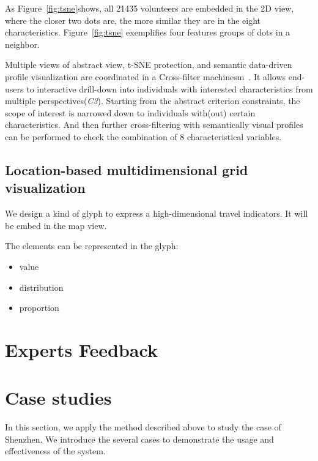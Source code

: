 As Figure~\ref{fig:tsne}shows, all 21435 volunteers are embedded in the 2D view, where the closer two dots are, the more similar they are in the eight characteristics. Figure~\ref{fig:tsne} exemplifies four features groups of dots in a neighbor.

Multiple views of abstract view, t-SNE protection, and semantic data-driven profile visualization are coordinated in a Cross-filter machinesm~\citep{Weaver2010}. It allows end-users to interactive drill-down into individuals with interested characteristics from multiple perspectives(\textit{C3}). Starting from the abstract criterion constraints, the scope of interest is narrowed down to individuals with(out) certain characteristics. And then further cross-filtering with semantically visual profiles can be performed to check the combination of 8 characteristical variables.


\subsection{Location-based multidimensional grid visualization}
We design a kind of glyph to express a high-dimensional travel indicators. It will be embed in the map view. 

The elements can be represented in the glyph:
\begin{itemize}
  \item value
  \item distribution
  \item proportion
\end{itemize}



\section{Experts Feedback}


\section{Case studies}

In this section, we apply the method described above to study the case of Shenzhen. We introduce the several cases to demonstrate the usage and effectiveness of the system.


